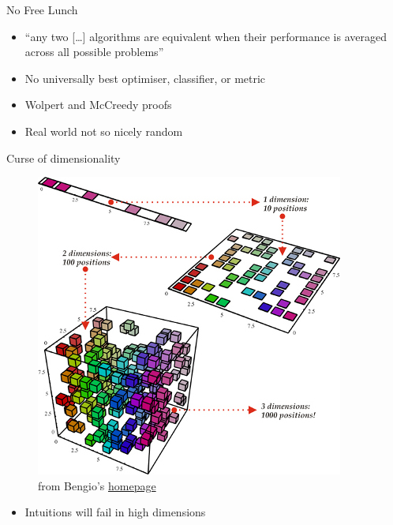 \documentclass[ignorenonframetext,]{beamer}
\begin{document}
\begin{frame}{No Free Lunch}

\begin{itemize}
\itemsep1pt\parskip0pt
\item
  ``any two {[}\ldots{}{]} algorithms are equivalent when their
  performance is averaged across all possible problems''
\item
  No universally best optimiser, classifier, or metric
\item
  Wolpert and McCreedy proofs
\item
  Real world not so nicely random
\end{itemize}

\end{frame}

\begin{frame}{Curse of dimensionality}

\begin{figure}[htbp]
\centering
\includegraphics{assets/presentation/GIML/bengio_dim.jpg}
\caption{from Bengio's
\href{http://www.iro.umontreal.ca/~bengioy/yoshua_en/research.html}{homepage}}
\end{figure}

\begin{itemize}
\itemsep1pt\parskip0pt
\item
  Intuitions will fail in high dimensions
\end{itemize}

\end{frame}
\end{document}

